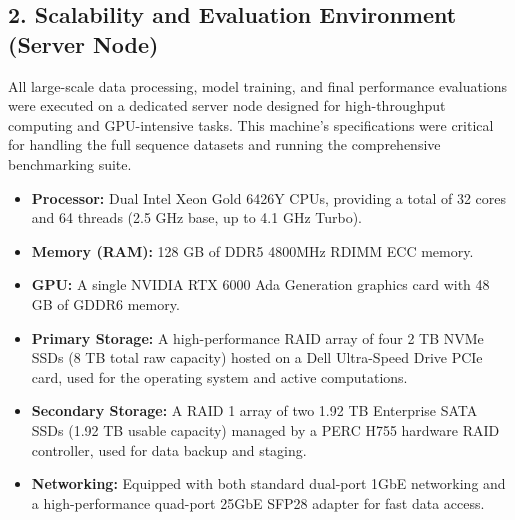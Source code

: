 \documentclass[utf8]{frontiers_suppmat}
\begin{document}
\subsection*{2. Scalability and Evaluation Environment (Server Node)}

All large-scale data processing, model training, and final performance evaluations were executed on a dedicated server node designed for high-throughput computing and GPU-intensive tasks. This machine's specifications were critical for handling the full sequence datasets and running the comprehensive benchmarking suite.
\begin{itemize}
	\item \textbf{Processor:} Dual Intel\textregistered{} Xeon\textregistered{} Gold 6426Y CPUs, providing a total of 32 cores and 64 threads (2.5 GHz base, up to 4.1 GHz Turbo).
	\item \textbf{Memory (RAM):} 128 GB of DDR5 4800MHz RDIMM ECC memory.
	\item \textbf{GPU:} A single NVIDIA RTX 6000 Ada Generation graphics card with 48 GB of GDDR6 memory.
	\item \textbf{Primary Storage:} A high-performance RAID array of four 2 TB NVMe SSDs (8 TB total raw capacity) hosted on a Dell Ultra-Speed Drive PCIe card, used for the operating system and active computations.
	\item \textbf{Secondary Storage:} A RAID 1 array of two 1.92 TB Enterprise SATA SSDs (1.92 TB usable capacity) managed by a PERC H755 hardware RAID controller, used for data backup and staging.
	\item \textbf{Networking:} Equipped with both standard dual-port 1GbE networking and a high-performance quad-port 25GbE SFP28 adapter for fast data access.
\end{itemize}

		
	
	
\end{document}
